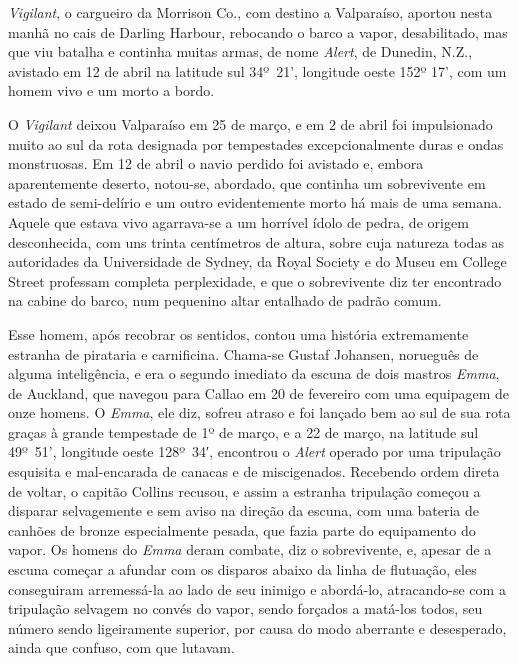 \emph{Vigilant}, o cargueiro da Morrison Co., com destino a Valparaíso,
aportou nesta manhã no cais de Darling Harbour, rebocando o barco a
vapor, desabilitado, mas que viu batalha e continha muitas armas, de
nome \emph{Alert}, de Dunedin, N.Z., avistado em 12 de abril na latitude
sul 34º~21', longitude oeste 152º 17', com um homem vivo e um morto a bordo.

O \emph{Vigilant} deixou Valparaíso em 25 de março, e em 2 de abril foi
impulsionado muito ao sul da rota designada por tempestades
excepcionalmente duras e ondas monstruosas. Em 12 de abril o navio
perdido foi avistado e, embora aparentemente deserto, notou-se,
abordado, que continha um sobrevivente em estado de semi-delírio e um
outro evidentemente morto há mais de uma semana. Aquele que estava vivo
agarrava-se a um horrível ídolo de pedra, de origem desconhecida, com
uns trinta centímetros de altura, sobre cuja natureza todas as
autoridades da Universidade de Sydney, da Royal Society e do Museu em
College Street professam completa perplexidade, e que o sobrevivente diz
ter encontrado na cabine do barco, num pequenino altar entalhado de
padrão comum.

Esse homem, após recobrar os sentidos, contou uma história extremamente
estranha de pirataria e carnificina. Chama-se Gustaf Johansen, norueguês
de alguma inteligência, e era o segundo imediato da escuna de dois
mastros \emph{Emma}, de Auckland, que navegou para Callao em 20 de
fevereiro com uma equipagem de onze homens. O \emph{Emma}, ele diz,
sofreu atraso e foi lançado bem ao sul de sua rota graças à grande
tempestade de 1º de março, e a 22 de março, na
latitude sul 49º~51', longitude
oeste 128º~34′, encontrou o \emph{Alert} operado por uma tripulação
esquisita e mal-encarada de canacas e de miscigenados. Recebendo ordem
direta de voltar, o capitão Collins recusou, e assim a estranha
tripulação começou a disparar selvagemente e sem aviso na direção da
escuna, com uma bateria de canhões de bronze especialmente pesada, que
fazia parte do equipamento do vapor. Os homens do \emph{Emma} deram
combate, diz o sobrevivente, e, apesar de a escuna começar a afundar com
os disparos abaixo da linha de flutuação, eles conseguiram arremessá-la
ao lado de seu inimigo e abordá-lo, atracando-se com a tripulação
selvagem no convés do vapor, sendo forçados a matá-los todos, seu número
sendo ligeiramente superior, por causa do modo aberrante e desesperado,
ainda que confuso, com que lutavam.

